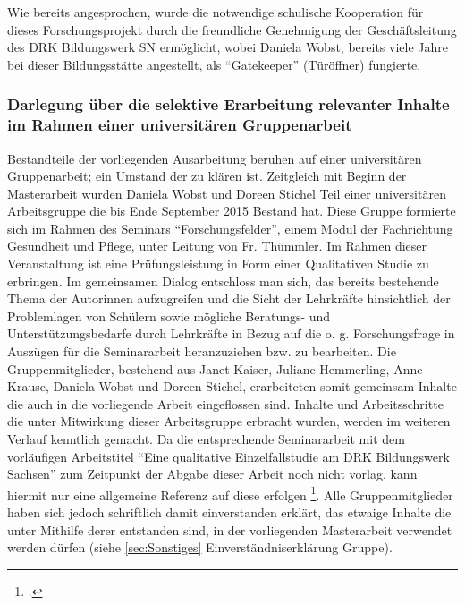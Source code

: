 Wie bereits angesprochen, wurde die notwendige schulische Kooperation für dieses Forschungsprojekt durch die freundliche Genehmigung der Geschäftsleitung des DRK Bildungswerk SN ermöglicht, wobei Daniela Wobst, bereits viele Jahre bei dieser Bildungsstätte angestellt, als "`Gatekeeper"' (Türöffner) fungierte. 

\subsubsection[Selektive Erarbeitung im Rahmen einer universitären Gruppenarbeit]{Darlegung über die selektive Erarbeitung relevanter Inhalte im Rahmen einer universitären Gruppenarbeit}
\label{sec:DarlegungÜberDieSelektiveErarbeitungRelevanterInhalteImRahmenEinerUniversitärenSeminararbeit}

Bestandteile der vorliegenden Ausarbeitung beruhen auf einer universitären Gruppenarbeit; ein Umstand der zu klären ist. Zeitgleich mit Beginn der Masterarbeit wurden Daniela Wobst und Doreen Stichel Teil einer universitären Arbeitsgruppe die bis Ende September 2015 Bestand hat. Diese Gruppe formierte sich im Rahmen des Seminars "`Forschungsfelder"', einem Modul der Fachrichtung Gesundheit und Pflege, unter Leitung von Fr. Thümmler. Im Rahmen dieser Veranstaltung ist eine Prüfungsleistung in Form einer Qualitativen Studie zu erbringen. Im gemeinsamen Dialog entschloss man sich, das bereits bestehende Thema der Autorinnen aufzugreifen und die Sicht der Lehrkräfte hinsichtlich der Problemlagen von Schülern sowie mögliche Beratungs- und Unterstützungsbedarfe durch Lehrkräfte in Bezug auf die o. g. Forschungsfrage in Auszügen für die Seminararbeit heranzuziehen bzw. zu bearbeiten. Die Gruppenmitglieder, bestehend aus Janet Kaiser, Juliane Hemmerling, Anne Krause, Daniela Wobst und Doreen Stichel, erarbeiteten somit gemeinsam Inhalte die auch in die vorliegende Arbeit eingeflossen sind. Inhalte und Arbeitsschritte die unter Mitwirkung dieser Arbeitsgruppe erbracht wurden, werden im weiteren Verlauf kenntlich gemacht. Da die entsprechende Seminararbeit mit dem vorläufigen Arbeitstitel "`Eine qualitative Einzelfallstudie am DRK Bildungswerk Sachsen"' zum Zeitpunkt der Abgabe dieser Arbeit noch nicht vorlag, kann hiermit nur eine allgemeine Referenz auf diese erfolgen \footcite{Hemmerling2015}. Alle Gruppenmitglieder haben sich jedoch schriftlich damit einverstanden erklärt, das etwaige Inhalte die unter Mithilfe derer entstanden sind, in der vorliegenden Masterarbeit verwendet werden dürfen (siehe \ref{sec:Sonstiges} Einverständniserklärung Gruppe).

